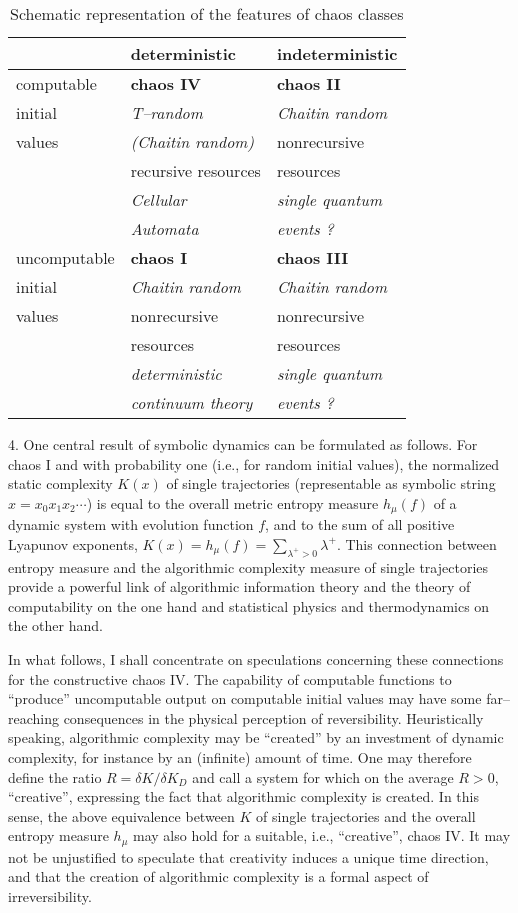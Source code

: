 \begin{table}
\begin{tabular}{|l||l|l|}
\hline
\multicolumn{1}{|l||}{    } & \multicolumn{1}{l|}{deterministic} &
\multicolumn{1}{l|}{indeterministic} \\ \hline \hline
computable & {\bf chaos IV} & {\bf chaos II} \\
initial & {\it T--random} & {\it Chaitin random}\\
values & {\it (Chaitin random)} & nonrecursive\\
 &    recursive resources & resources \\
 & {\sl Cellular} & {\sl single quantum} \\
 & {\sl Automata} & {\sl events ?} \\
\hline
uncomputable & {\bf chaos I} & {\bf chaos III}\\
initial & {\it Chaitin random} & {\it Chaitin random}\\
values & nonrecursive & nonrecursive \\
 & resources & resources \\
 & {\sl deterministic} & {\sl single quantum}\\
 & {\sl continuum theory} & {\sl events ?} \\ \hline
\end{tabular}
\caption{Schematic representation of the features of chaos classes}
\end{table}


4.
One central result of symbolic dynamics \cite{alekseev} can be
formulated as follows.
For chaos I and with probability one (i.e., for random initial values),
the normalized static complexity $K(x)$ of single trajectories
(representable as symbolic string $x=x_0x_1x_2\cdots $) is equal to the
overall metric entropy measure $h_\mu (f)$ of a dynamic system with
evolution function \cite{2}
$f$, and to the sum of all positive
Lyapunov exponents, $K(x)=h_\mu (f)=\sum_{\lambda^+>0}\lambda^+$.
This connection between entropy measure and the algorithmic complexity
measure of single trajectories provide a powerful link
of algorithmic
information theory and the theory of computability on the one hand and
statistical physics and thermodynamics on the other hand.

In what follows, I shall concentrate on speculations concerning these
connections for the constructive chaos IV.
The capability of computable functions to ``produce'' uncomputable
output on computable initial values may have some far--reaching
consequences in the physical perception of reversibility.
Heuristically speaking, algorithmic complexity may be ``created''
by an investment of dynamic complexity, for instance by an (infinite)
amount of time.
One may therefore define the ratio $R=\delta K/\delta K_D$ and call a
system
for which on the average $R>0$, ``creative'', expressing the fact that
algorithmic complexity is created.
In this sense, the above equivalence between $K$ of single trajectories
and the overall entropy measure $h_\mu $ may also hold for a suitable,
i.e., ``creative'', chaos IV.
It may not be unjustified to speculate that creativity induces a unique
time direction,
and that the creation of algorithmic
complexity is a formal aspect of irreversibility.

